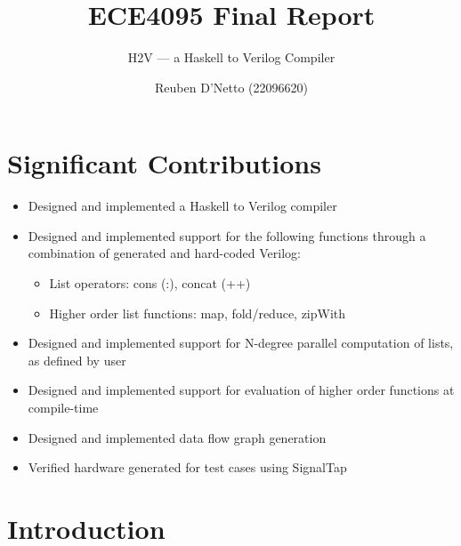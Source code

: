 \documentclass[english,onecolumn]{scrartcl}
\begin{document}
\title{ECE4095 Final Report}
\subtitle{H2V --- a Haskell to Verilog Compiler}
\author{Reuben D'Netto (22096620)}

\maketitle
\tableofcontents{}
\pagebreak{}


\section{Significant Contributions}
\begin{itemize}
    \item Designed and implemented a Haskell to Verilog compiler
    \item Designed and implemented support for the following functions through a combination of generated and hard-coded Verilog:
        \begin{itemize}
            \item List operators: cons (:), concat (++)
            \item Higher order list functions: map, fold/reduce, zipWith
        \end{itemize}
    \item Designed and implemented support for N-degree parallel computation of lists, as defined by user
    \item Designed and implemented support for evaluation of higher order functions at compile-time
    \item Designed and implemented data flow graph generation
    \item Verified hardware generated for test cases using SignalTap
\end{itemize}


\newcommand\invisiblesection[1]{%
    \refstepcounter{section}%
    \addcontentsline{toc}{section}{\protect\numberline{\thesection}#1}%
    \sectionmark{#1}}




\section{Introduction}
\end{document}
